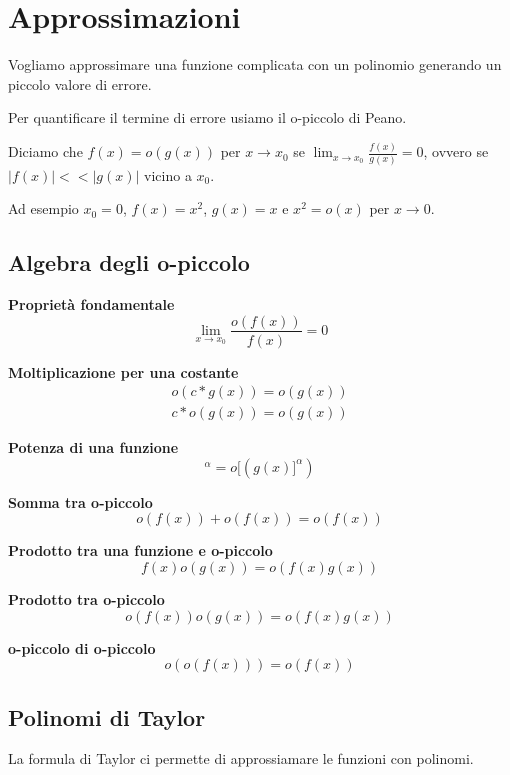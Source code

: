 \chapter{Approssimazioni}
Vogliamo approssimare una funzione complicata con un polinomio generando un piccolo valore di errore.

Per quantificare il termine di errore usiamo il o-piccolo di Peano.
\begin{definition}
    Diciamo che $f(x)=o(g(x))$ per $x\to x_0$ se $\lim_{x\to x_0}\frac{f(x)}{g(x)}=0$, ovvero se $|f(x)|<<|g(x)|$ vicino a $x_0$.
    
    Ad esempio $x_0=0$, $f(x)=x^2$, $g(x)=x$ e $x^2=o(x)$ per $x\to 0$.
\end{definition}

\section{Algebra degli o-piccolo}
\textbf{Proprietà fondamentale}
\begin{equation*}
    \lim_{x\to x_0}\frac{o(f(x))}{f(x)}=0
\end{equation*}

\textbf{Moltiplicazione per una costante}
\begin{align*}
    o(c*g(x))=o(g(x))\\
    c*o(g(x))=o(g(x))
\end{align*}

\textbf{Potenza di una funzione}
\begin{equation*}
    [f(x)]^\alpha = o[(g(x)]^\alpha)
\end{equation*}

\textbf{Somma tra o-piccolo}
\begin{equation*}
    o(f(x))+o(f(x))=o(f(x))
\end{equation*}

\textbf{Prodotto tra una funzione e o-piccolo}
\begin{equation*}
    f(x)o(g(x))=o(f(x)g(x))
\end{equation*}

\textbf{Prodotto tra o-piccolo}
\begin{equation*}
    o(f(x))o(g(x))=o(f(x)g(x))
\end{equation*}

\textbf{o-piccolo di o-piccolo}
\begin{equation*}
    o(o(f(x)))=o(f(x))
\end{equation*}

\section{Polinomi di Taylor}
La formula di Taylor ci permette di approssiamare le funzioni con polinomi.

